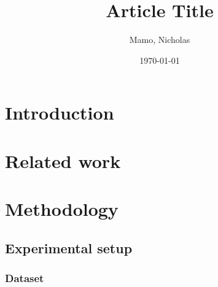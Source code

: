 \documentclass[twocolumn]{elegantarticle}
\title{Article Title}
\author{Mamo, Nicholas}
\date{\today}
\begin{document}
	\maketitle
	
	\section{Introduction}
	
		\lipsum[1-3]
	
	\section{Related work}
	
		\lipsum[4-8]
		
	\section{Methodology}
	
		\lipsum[9]
		
		\subsection{Experimental setup}
		
			\lipsum[10]
			
			\subsubsection{Dataset}
			
				\lipsum[11-13]
\end{document}
